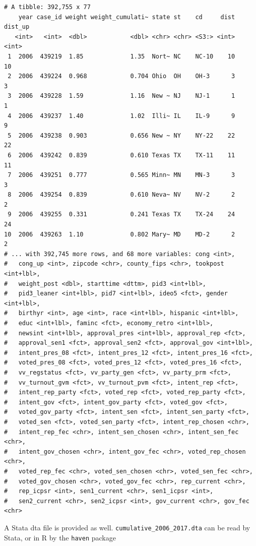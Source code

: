 \documentclass[10pt,article,oneside]{memoir}
\theoremstyle{definition}
\begin{document}
\begin{verbatim}
# A tibble: 392,755 x 77
    year case_id weight weight_cumulati~ state st    cd     dist dist_up
   <int>   <int>  <dbl>            <dbl> <chr> <chr> <S3:> <int>   <int>
 1  2006  439219  1.85             1.35  Nort~ NC    NC-10    10      10
 2  2006  439224  0.968            0.704 Ohio  OH    OH-3      3       3
 3  2006  439228  1.59             1.16  New ~ NJ    NJ-1      1       1
 4  2006  439237  1.40             1.02  Illi~ IL    IL-9      9       9
 5  2006  439238  0.903            0.656 New ~ NY    NY-22    22      22
 6  2006  439242  0.839            0.610 Texas TX    TX-11    11      11
 7  2006  439251  0.777            0.565 Minn~ MN    MN-3      3       3
 8  2006  439254  0.839            0.610 Neva~ NV    NV-2      2       2
 9  2006  439255  0.331            0.241 Texas TX    TX-24    24      24
10  2006  439263  1.10             0.802 Mary~ MD    MD-2      2       2
# ... with 392,745 more rows, and 68 more variables: cong <int>,
#   cong_up <int>, zipcode <chr>, county_fips <chr>, tookpost <int+lbl>,
#   weight_post <dbl>, starttime <dttm>, pid3 <int+lbl>,
#   pid3_leaner <int+lbl>, pid7 <int+lbl>, ideo5 <fct>, gender <int+lbl>,
#   birthyr <int>, age <int>, race <int+lbl>, hispanic <int+lbl>,
#   educ <int+lbl>, faminc <fct>, economy_retro <int+lbl>,
#   newsint <int+lbl>, approval_pres <int+lbl>, approval_rep <fct>,
#   approval_sen1 <fct>, approval_sen2 <fct>, approval_gov <int+lbl>,
#   intent_pres_08 <fct>, intent_pres_12 <fct>, intent_pres_16 <fct>,
#   voted_pres_08 <fct>, voted_pres_12 <fct>, voted_pres_16 <fct>,
#   vv_regstatus <fct>, vv_party_gen <fct>, vv_party_prm <fct>,
#   vv_turnout_gvm <fct>, vv_turnout_pvm <fct>, intent_rep <fct>,
#   intent_rep_party <fct>, voted_rep <fct>, voted_rep_party <fct>,
#   intent_gov <fct>, intent_gov_party <fct>, voted_gov <fct>,
#   voted_gov_party <fct>, intent_sen <fct>, intent_sen_party <fct>,
#   voted_sen <fct>, voted_sen_party <fct>, intent_rep_chosen <chr>,
#   intent_rep_fec <chr>, intent_sen_chosen <chr>, intent_sen_fec <chr>,
#   intent_gov_chosen <chr>, intent_gov_fec <chr>, voted_rep_chosen <chr>,
#   voted_rep_fec <chr>, voted_sen_chosen <chr>, voted_sen_fec <chr>,
#   voted_gov_chosen <chr>, voted_gov_fec <chr>, rep_current <chr>,
#   rep_icpsr <int>, sen1_current <chr>, sen1_icpsr <int>,
#   sen2_current <chr>, sen2_icpsr <int>, gov_current <chr>, gov_fec <chr>
\end{verbatim}

A Stata dta file is provided as well.
\texttt{cumulative\_2006\_2017.dta} can be read by Stata, or in R by the
\texttt{haven} package
\end{document}
